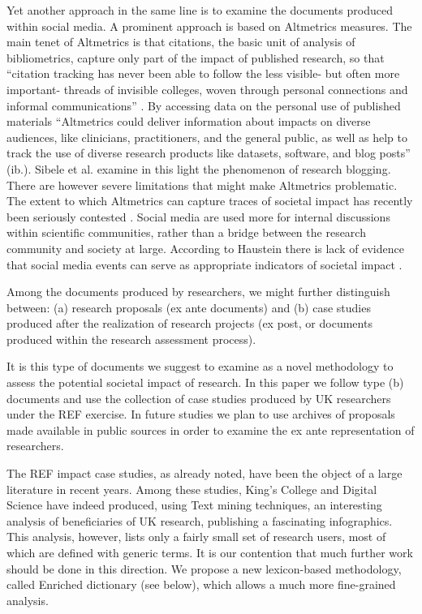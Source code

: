 \documentclass[]{book}
\theoremstyle{definition}
\theoremstyle{definition}
\theoremstyle{definition}
\theoremstyle{remark}
\begin{document}
Yet another approach in the same line is to examine the documents
produced within social media. A prominent approach is based on
Altmetrics measures. The main tenet of Altmetrics is that citations, the
basic unit of analysis of bibliometrics, capture only part of the impact
of published research, so that ``citation tracking has never been able
to follow the less visible- but often more important- threads of
invisible colleges, woven through personal connections and informal
communications'' \citep{priem2012altmetrics}. By accessing data on the
personal use of published materials ``Altmetrics could deliver
information about impacts on diverse audiences, like clinicians,
practitioners, and the general public, as well as help to track the use
of diverse research products like datasets, software, and blog posts''
(ib.). Sibele et al. \citep{fausto2012research} examine in this light
the phenomenon of research blogging. There are however severe
limitations that might make Altmetrics problematic. The extent to which
Altmetrics can capture traces of societal impact has recently been
seriously contested \citep{bornmann2014evaluate}. Social media are used
more for internal discussions within scientific communities, rather than
a bridge between the research community and society at large. According
to Haustein there is lack of evidence that social media events can serve
as appropriate indicators of societal impact \citep{haustein2016tweets}.

Among the documents produced by researchers, we might further
distinguish between: (a) research proposals (ex ante documents) and (b)
case studies produced after the realization of research projects (ex
post, or documents produced within the research assessment process).

It is this type of documents we suggest to examine as a novel
methodology to assess the potential societal impact of research. In this
paper we follow type (b) documents and use the collection of case
studies produced by UK researchers under the REF exercise. In future
studies we plan to use archives of proposals made available in public
sources in order to examine the ex ante representation of researchers.

The REF impact case studies, as already noted, have been the object of a
large literature in recent years. Among these studies, King's College
and Digital Science \citep{king2015nature} have indeed produced, using
Text mining techniques, an interesting analysis of beneficiaries of UK
research, publishing a fascinating infographics. This analysis, however,
lists only a fairly small set of research users, most of which are
defined with generic terms. It is our contention that much further work
should be done in this direction. We propose a new lexicon-based
methodology, called Enriched dictionary (see below), which allows a much
more fine-grained analysis.
\end{document}
